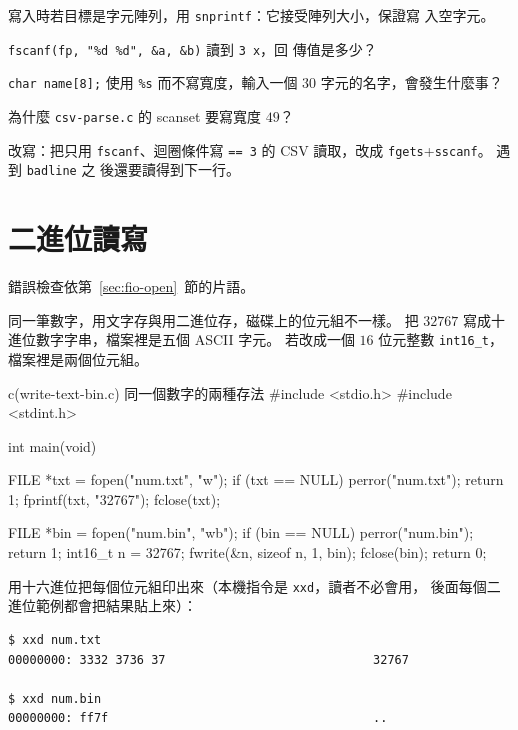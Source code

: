 寫入時若目標是字元陣列，用 \texttt{snprintf}：它接受陣列大小，保證寫
入空字元。


\begin{drills}[label=drills:fio-fmt]
\item \texttt{fscanf(fp, "\%d \%d", \&a, \&b)} 讀到 \texttt{3 x}，回
傳值是多少？
\item \texttt{char name[8];} 使用 \texttt{\%s} 而不寫寬度，輸入一個
$30$ 字元的名字，會發生什麼事？
\item 為什麼 \texttt{csv-parse.c} 的 scanset 要寫寬度 $49$？
\item 改寫：把只用 \texttt{fscanf}、迴圈條件寫 \texttt{== 3} 的 CSV
讀取，改成 \texttt{fgets}+\texttt{sscanf}。 遇到 \texttt{badline} 之
後還要讀得到下一行。
\end{drills}

\section{二進位讀寫}
\label{sec:fio-bin}

錯誤檢查依第~\ref{sec:fio-open}~節的片語。

同一筆數字，用文字存與用二進位存，磁碟上的位元組不一樣。 把
$32767$ 寫成十進位數字字串，檔案裡是五個 ASCII 字元。 若改成一個
$16$ 位元整數 \texttt{int16\_t}，檔案裡是兩個位元組。

\begin{example}[label=ex:fio-text-bin]{c}{(write-text-bin.c) 同一個數字的兩種存法}
#include <stdio.h>
#include <stdint.h>

int main(void) {
    FILE *txt = fopen("num.txt", "w");
    if (txt == NULL) {
        perror("num.txt");
        return 1;
    }
    fprintf(txt, "32767");
    fclose(txt);

    FILE *bin = fopen("num.bin", "wb");
    if (bin == NULL) {
        perror("num.bin");
        return 1;
    }
    int16_t n = 32767;
    fwrite(&n, sizeof n, 1, bin);
    fclose(bin);
    return 0;
}
\end{example}

用十六進位把每個位元組印出來（本機指令是 \texttt{xxd}，讀者不必會用，
後面每個二進位範例都會把結果貼上來）：

\begin{center}
\begin{verbatim}
$ xxd num.txt
00000000: 3332 3736 37                             32767

$ xxd num.bin
00000000: ff7f                                     ..
\end{verbatim}
\end{center}

